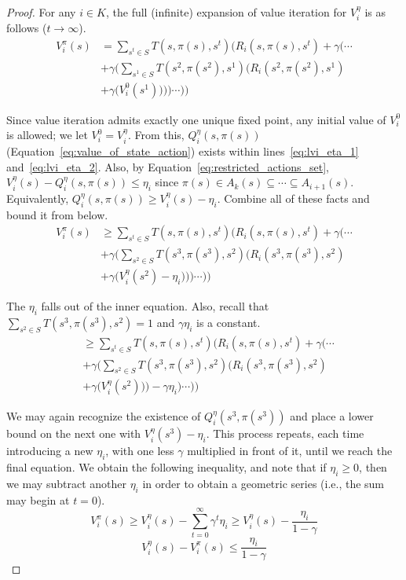 \begin{proof}
For any $i \in K$, the full (infinite) expansion of value iteration for $V_i^\eta$ is as follows ($t \rightarrow \infty$).
\begin{align}
    V_i^\pi(s) &= \sum_{s^t \in S} T(s, \pi(s), s^t) \Big( R_i(s, \pi(s), s^t) + \gamma \Big( \cdots \nonumber \\
        &+ \gamma \Big( \sum_{s^1 \in S} T(s^2, \pi(s^2), s^1) \Big( R_i(s^2, \pi(s^2), s^1) \label{eq:lvi_eta_1} \\
        &+ \gamma \Big( V_i^0 (s^1) \Big) \Big) \Big) \cdots \Big) \Big) \label{eq:lvi_eta_2}
\end{align}

Since value iteration admits exactly one unique fixed point, any initial value of $V_i^0$ is allowed; we let $V_i^0 = V_i^\eta$. From this, $Q_i^\eta(s, \pi(s))$ (Equation~\ref{eq:value_of_state_action}) exists within lines~\ref{eq:lvi_eta_1} and~\ref{eq:lvi_eta_2}. Also, by Equation~\ref{eq:restricted_actions_set}, $V_i^\eta(s) - Q_i^\eta(s, \pi(s)) \leq \eta_i$ since $\pi(s) \in A_k(s) \subseteq \cdots \subseteq A_{i+1}(s)$. Equivalently, $Q_i^\eta(s, \pi(s)) \geq V_i^\eta(s) - \eta_i$. Combine all of these facts and bound it from below.
\begin{align*}
    V_i^\pi(s) &\geq \sum_{s^t \in S} T(s, \pi(s), s^t) \Big( R_i(s, \pi(s), s^t) + \gamma \Big( \cdots \nonumber \\
        &+ \gamma \Big( \sum_{s^2 \in S} T(s^3, \pi(s^3), s^2) \Big( R_i(s^3, \pi(s^3), s^2) \\
        &+ \gamma \Big( V_i^\eta(s^2) - \eta_i \Big) \Big) \Big) \cdots \Big) \Big)
\end{align*}

The $\eta_i$ falls out of the inner equation. Also, recall that $\sum_{s^2 \in S} T(s^3, \pi(s^3), s^2) = 1$ and $\gamma \eta_i$ is a constant.
\begin{align*}
        &\geq \sum_{s^t \in S} T(s, \pi(s), s^t) \Big( R_i(s, \pi(s), s^t) + \gamma \Big( \cdots \\
        &+ \gamma \Big( \sum_{s^2 \in S} T(s^3, \pi(s^3), s^2) \Big( R_i(s^3, \pi(s^3), s^2) \\
        &+ \gamma \Big( V_i^\eta(s^2) \Big) \Big) - \gamma \eta_i \Big) \cdots \Big) \Big)
\end{align*}

We may again recognize the existence of $Q_i^\eta(s^3, \pi(s^3))$ and place a lower bound on the next one with $V_i^\eta(s^3) - \eta_i$. This process repeats, each time introducing a new $\eta_i$, with one less $\gamma$ multiplied in front of it, until we reach the final equation. We obtain the following inequality, and note that if $\eta_i \geq 0$, then we may subtract another $\eta_i$ in order to obtain a geometric series (i.e., the sum may begin at $t = 0$).
\begin{equation*}
    V_i^\pi(s) \geq V_i^\eta(s) - \sum_{t = 0}^\infty \gamma^t \eta_i \geq V_i^\eta(s) - \frac{\eta_i}{1 - \gamma}
\end{equation*}
\begin{equation*}
    V_i^\eta(s) - V_i^\pi(s) \leq \frac{\eta_i}{1 - \gamma}
\end{equation*}


\end{proof}

